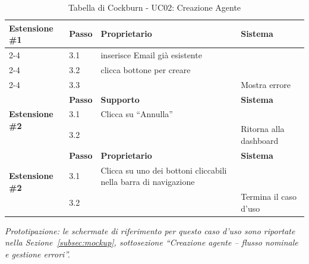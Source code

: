 \documentclass[a4paper,11pt]{article}
\begin{document}
\begin{table}[H]
\begin{tabular}{|p{3cm}|l|p{4.5cm}|p{4.5cm}|}
\hline
\multirow{3}{3cm}{\textbf{Estensione \#1}} 
   & \textbf{Passo} & \textbf{Proprietario} & \textbf{Sistema} \\ \cline{2-4}
   & 3.1 & inserisce Email già esistente & \\ \cline{2-4}
   & 3.2 & clicca bottone per creare & \\ \cline{2-4}
   & 3.3 & & Mostra errore \\ \hline
   \multirow{3}{3cm}{\textbf{Estensione \#2}} 
   & \textbf{Passo} & \textbf{Supporto} & \textbf{Sistema} \\ \cline{2-4}
   & 3.1 & Clicca su ``Annulla'' & \\ \cline{2-4}
   & 3.2 & & Ritorna alla dashboard \\ \hline
\multirow{3}{3cm}{\textbf{Estensione \#2}} 
   & \textbf{Passo} & \textbf{Proprietario} & \textbf{Sistema} \\ \cline{2-4}
   & 3.1 & Clicca su uno dei bottoni \newline cliccabili nella barra di navigazione
 & \\ \cline{2-4}
   & 3.2 & & Termina il caso d’uso \\ \hline
\end{tabular}
\caption{Tabella di Cockburn - UC02: Creazione Agente}
\end{table}
\smallskip
\noindent\textit{Prototipazione: le schermate di riferimento per questo caso d'uso sono riportate nella Sezione~\ref{subsec:mockup}, sottosezione ``Creazione agente -- flusso nominale e gestione errori''.}
\clearpage
\end{document}
